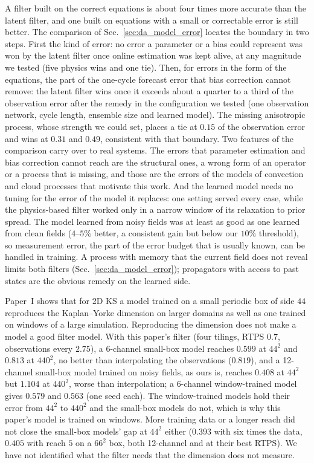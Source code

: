  A filter built on the correct
equations is about four times more accurate than the latent filter, and one
built on equations with a small or correctable error is still better. The
comparison of Sec.~\ref{sec:da_model_error} locates the boundary in two
steps. First the kind of error: no error a parameter or a bias could
represent was won by the latent filter once online estimation was kept
alive, at any magnitude we tested (five physics wins and one tie).
Then, for errors in the form of the equations, the part of the one-cycle
forecast error that bias correction cannot remove: the latent filter wins
once it exceeds about a quarter to a third of the observation error after the remedy in the configuration we tested
(one observation network, cycle length, ensemble size and learned model).
The missing anisotropic process,
whose strength we could set, places a tie at $0.15$ of the observation
error and wins at $0.31$ and $0.49$, consistent with that boundary. Two
features of the comparison carry over to real systems. The errors that
parameter estimation and bias correction cannot reach are the structural
ones, a wrong form of an operator or a process that is missing, and those
are the errors of the models of convection and cloud processes that
motivate this work. And the learned model needs no tuning for the error of
the model it replaces: one setting served every case, while the
physics-based filter worked only in a narrow window of its relaxation to
prior spread. The model learned from noisy fields was at least as good as
one learned from clean fields ($4$--$5\%$ better, a consistent gain but below
our $10\%$ threshold), so measurement error, the part of the error
budget that is usually known, can be handled in training. A process with
memory that the current field does not reveal limits both filters
(Sec.~\ref{sec:da_model_error}); propagators with access to past states are
the obvious remedy on the learned side.

 Paper~I shows that for 2D KS a model trained on a small periodic box of
side $44$ reproduces the Kaplan--Yorke dimension on larger domains as well as one trained on windows
of a large simulation. Reproducing the dimension does not make a model a good filter model. With this
paper's filter (four tilings, RTPS $0.7$, observations every $2.75$), a 6-channel small-box model reaches
$0.599$ at $44^2$ and $0.813$ at $440^2$, no better than interpolating the observations ($0.819$), and a
12-channel small-box model trained on noisy fields, as ours is, reaches $0.408$ at $44^2$ but $1.104$ at
$440^2$, worse than interpolation; a 6-channel window-trained model gives $0.579$ and $0.563$ (one seed
each). The window-trained models hold their error from $44^2$ to $440^2$ and the small-box models do not,
which is why this paper's model is trained on windows. More training data or a longer reach did not close
the small-box models' gap at $44^2$ either ($0.393$ with six times the data, $0.405$ with reach $5$ on a
$66^2$ box, both 12-channel and at their best RTPS). We have not identified what the filter needs that the dimension does not measure.

